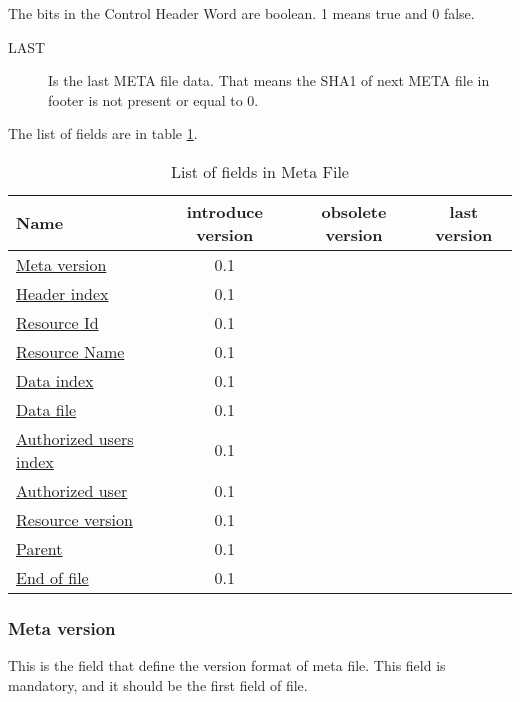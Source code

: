 The bits in the Control Header Word are boolean. 1 means true and 0 false.
\begin{description}
  \item [LAST] Is the last META file data. That means the SHA1 of next META file in footer is not present or equal to 0.
\end{description}



The list of fields are in table \ref{tab:field-list}.

\begin{table}[htbp]
  \begin{tabular}{l|c|c|c}
    Name & introduce version & obsolete version & last version \\
    \hline
    \hyperlink{fields:meta-version}{Meta version} & 0.1 & & \\
    \hyperlink{fields:header-index}{Header index} & 0.1 & & \\
    \hyperlink{fields:resource-id}{Resource Id} & 0.1 & & \\
    \hyperlink{fields:resource-name}{Resource Name} & 0.1 & & \\
    \hyperlink{fields:data-index}{Data index} & 0.1 & & \\
    \hyperlink{fields:data-file}{Data file} & 0.1 & & \\
    \hyperlink{fields:auth-user-index}{Authorized users index} & 0.1 & & \\
    \hyperlink{fields:auth-user}{Authorized user} & 0.1 & & \\
    \hyperlink{fields:version}{Resource version} & 0.1 & & \\
    \hyperlink{fields:parents}{Parent} & 0.1 & & \\
    \hyperlink{fields:end-of-file}{End of file} & 0.1 & & \\
  \end{tabular}
  \caption{List of fields in Meta File}
  \label{tab:field-list}
\end{table}


\hypertarget{fields:meta-version}{\subsubsection{Meta version}}

This is the field that define the version format of meta file. This field is mandatory, and it should be the first field of file.

